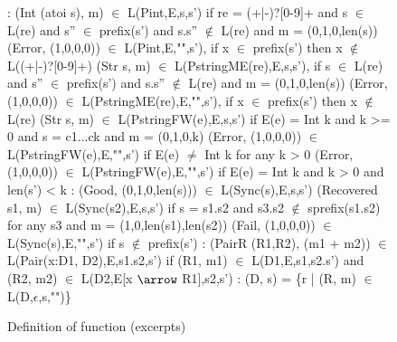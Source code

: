 \begin{figure}[t]
{\small
\begin{code}
\cdmath\small
{}:
(Int (atoi s), m) $\in$ L(Pint,E,s,s')
  if re = (+|-)?[0-9]+
  and s $\in$ L(re) 
  and s'' $\in$ prefix(s') and s.s'' $\not\in$ L(re)
  and m = (0,1,0,len(s))
(Error, (1,0,0,0)) $\in$ L(Pint,E,"",s'),
  if x $\in$ prefix(s') then x $\not\in$ L((+|-)?[0-9]+) 
(Str s, m) $\in$ L(PstringME(re),E,s,s'),
  if s $\in$ L(re) 
  and s'' $\in$ prefix(s') and s.s'' $\not\in$ L(re) 
  and m = (0,1,0,len(s)) 
(Error, (1,0,0,0)) $\in$ L(PstringME(re),E,"",s'), 
  if x $\in$ prefix(s') then x $\not\in$ L(re)
(Str s, m) $\in$ L(PstringFW(e),E,s,s') 
  if E(e) = Int k and k >= 0
  and s = c1...ck and m = (0,1,0,k)
(Error, (1,0,0,0)) $\in$ L(PstringFW(e),E,"",s') 
  if E(e) $\ne$ Int k for any k > 0
(Error, (1,0,0,0)) $\in$ L(PstringFW(e),E,"",s') 
  if E(e) = Int k and k > 0 and len(s') < k
\mbox{}
:
(Good, (0,1,0,len(s))) $\in$ L(Sync(s),E,s,s')
(Recovered s1, m) $\in$ L(Sync(s2),E,s,s')
  if s = s1.s2 
  and s3.s2 $\not\in$ sprefix(s1.s2) for any s3
  and m = (1,0,len(s1),len(s2))
(Fail, (1,0,0,0)) $\in$ L(Sync(s),E,"",s')
  if s $\not\in$ prefix(s')
\mbox{}
:
(PairR (R1,R2), (m1 + m2)) 
        $\in$ L(Pair(x:D1, D2),E,s1.s2,s')
  if  (R1, m1) $\in$ L(D1,E,s1,s2.s')
  and (R2, m2) $\in$ L(D2,E[x $\arrow$ R1],s2,s')
\mbox{}
:
(D, s) = \{r | (R, m) $\in$ L(D,$\epsilon$,s,"")\} 
\end{code}
}
\caption{Definition of  function (excerpts)}
\label{fig:parse-sem}
\end{figure}




